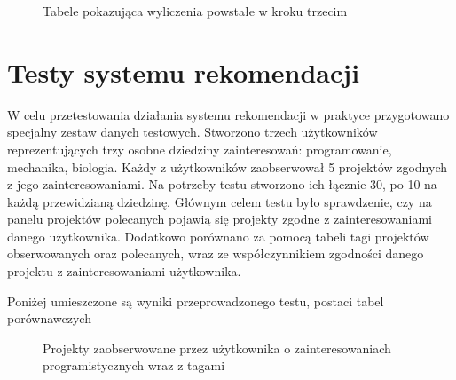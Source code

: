 \begin{figure}[h!]
	\caption{Tabele pokazująca wyliczenia powstałe w kroku trzecim}
	\centering
\end{figure}

\clearpage

\section{Testy systemu rekomendacji}

W celu przetestowania działania systemu rekomendacji w praktyce przygotowano specjalny zestaw danych testowych. Stworzono trzech użytkowników reprezentujących trzy osobne dziedziny zainteresowań: programowanie, mechanika, biologia. Każdy z użytkowników zaobserwował 5 projektów zgodnych z jego zainteresowaniami. Na potrzeby testu stworzono ich łącznie 30, po 10 na każdą przewidzianą dziedzinę. 
Głównym celem testu było sprawdzenie, czy na panelu projektów polecanych pojawią się projekty zgodne z zainteresowaniami danego użytkownika. Dodatkowo porównano za pomocą tabeli tagi projektów obserwowanych oraz polecanych, wraz ze współczynnikiem zgodności danego projektu z zainteresowaniami użytkownika. 


Poniżej umieszczone są wyniki przeprowadzonego testu, postaci tabel porównawczych

\begin{figure}[h!]
	\caption{Projekty zaobserwowane przez użytkownika o zainteresowaniach programistycznych wraz z tagami}
	\centering
\end{figure}


